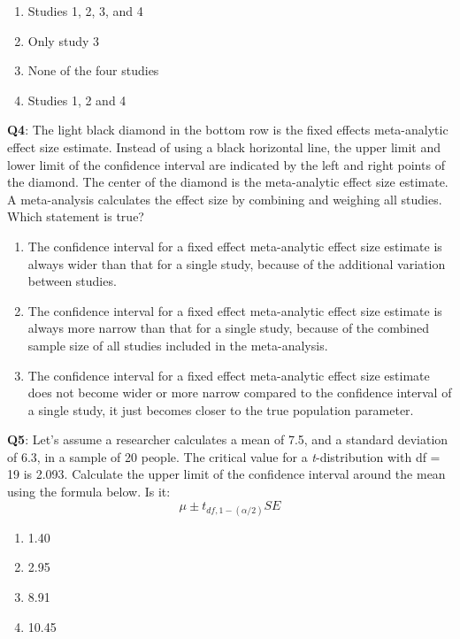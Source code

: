 \documentclass[
  oneside]{book}
\providecommand{\tightlist}{%
  \setlength{\itemsep}{0pt}\setlength{\parskip}{0pt}}
\begin{document}
\begin{enumerate}
\def\labelenumi{\Alph{enumi})}
\tightlist
\item
  Studies 1, 2, 3, and 4
\item
  Only study 3
\item
  None of the four studies
\item
  Studies 1, 2 and 4
\end{enumerate}

\textbf{Q4}: The light black diamond in the bottom row is the fixed effects meta-analytic effect size estimate. Instead of using a black horizontal line, the upper limit and lower limit of the confidence interval are indicated by the left and right points of the diamond. The center of the diamond is the meta-analytic effect size estimate. A meta-analysis calculates the effect size by combining and weighing all studies. Which statement is true?

\begin{enumerate}
\def\labelenumi{\Alph{enumi})}
\tightlist
\item
  The confidence interval for a fixed effect meta-analytic effect size estimate is always wider than that for a single study, because of the additional variation between studies.
\item
  The confidence interval for a fixed effect meta-analytic effect size estimate is always more narrow than that for a single study, because of the combined sample size of all studies included in the meta-analysis.
\item
  The confidence interval for a fixed effect meta-analytic effect size estimate does not become wider or more narrow compared to the confidence interval of a single study, it just becomes closer to the true population parameter.
\end{enumerate}

\textbf{Q5}: Let's assume a researcher calculates a mean of 7.5, and a standard deviation of 6.3, in a sample of 20 people. The critical value for a \emph{t}-distribution with df = 19 is 2.093. Calculate the upper limit of the confidence interval around the mean using the formula below. Is it:
\[
\mu \pm t_{df, 1-(\alpha/2)} SE
\]

\begin{enumerate}
\def\labelenumi{\Alph{enumi})}
\tightlist
\item
  1.40
\item
  2.95
\item
  8.91
\item
  10.45
\end{enumerate}
\end{document}
